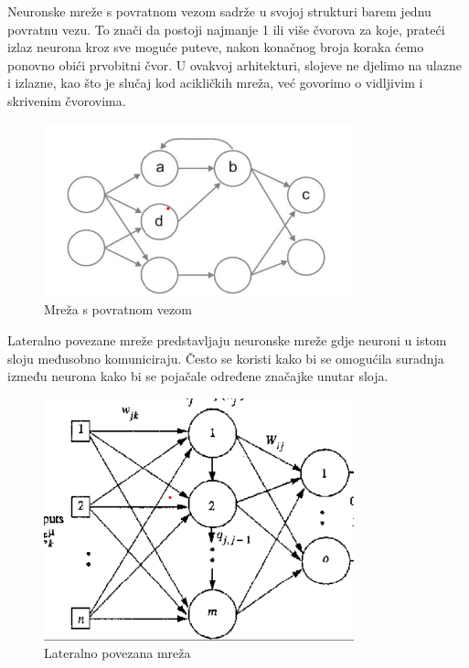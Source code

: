 Neuronske mreže s povratnom vezom sadrže u svojoj strukturi barem jednu povratnu vezu.
To znači da postoji najmanje 1 ili više čvorova za koje, prateći izlaz neurona kroz sve moguće puteve, nakon konačnog broja koraka ćemo ponovno obići prvobitni čvor.
U ovakvoj arhitekturi, slojeve ne djelimo na ulazne i izlazne, kao što je slučaj kod acikličkih mreža, već govorimo o vidljivim i skrivenim čvorovima.
\FloatBarrier
\begin{figure}[h]
    \centering
    \includegraphics[width=0.8\textwidth]{images/nn-povratna-veza}
    \caption{Mreža s povratnom vezom
    \protect\footnotemark}
    \label{fig:slika5}
\end{figure}
\FloatBarrier
{}

\pagebreak
Lateralno povezane mreže predstavljaju neuronske mreže gdje neuroni u istom sloju međusobno komuniciraju.
Često se koristi kako bi se omogućila suradnja između neurona kako bi se pojačale određene značajke unutar sloja.
\FloatBarrier
\begin{figure}[h]
    \centering
    \includegraphics[width=0.8\textwidth]{images/Lateral-connected-nn}
    \caption{Lateralno povezana mreža
    \protect\footnotemark}
    \label{fig:slika6}
\end{figure}
\FloatBarrier
{}


